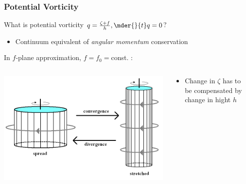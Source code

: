\documentclass[12pt]{beamer}
\begin{document}
\begin{frame}
\frametitle{Potential Vorticity}
What is potential vorticity $q=\frac{\zeta+f}{h}, \mder{}{t}q=0$?
\vspace{0.5cm}
\begin{itemize}
\item Continuum equivalent of \textit{angular momentum} conservation
\end{itemize}
\vspace{0.5cm}
In $f$-plane approximation, $f=f_0=$const. :
\vspace{0.2cm}
\begin{columns}
    \begin{column}{0.48\textwidth}
        \includegraphics[width=\linewidth]{Potential_vorticity_conservation}
    \end{column}
    \begin{column}{0.48\textwidth}
       \begin{itemize}
	\item Change in $\zeta$ has to be compensated by change in hight $h$
	\end{itemize}
    \end{column}
\end{columns}
\end{frame}
\end{document}
